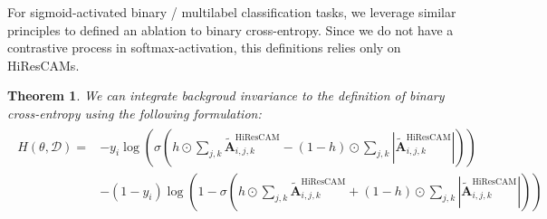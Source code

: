 \documentclass{article}
\theoremstyle{plain}
\newtheorem{theorem}{Theorem}[section]
\theoremstyle{definition}
\theoremstyle{remark}
\begin{document}
For sigmoid-activated binary / multilabel classification tasks, we leverage similar principles to defined an ablation to binary cross-entropy. Since we do not have a contrastive process in softmax-activation, this definitions relies only on HiResCAMs.

\begin{theorem}\label{abce}
	We can integrate backgroud invariance to the definition of binary cross-entropy using the following formulation:
	\begin{gather}
		\begin{split}
			H(\theta, \mathcal{D}) = &- y_i \log \left(\sigma\left(h \odot \sum_{j,k}\tilde{\mathcal{\bm{A}}}_{i,j,k}^{\text{HiResCAM}} - (1-h) \odot \sum_{j,k}|\tilde{\mathcal{\bm{A}}}_{i,j,k}^{\text{HiResCAM}}|\right) \right) \\
			&- (1 - y_i) \log \left(1 - \sigma\left(h \odot \sum_{j,k}\tilde{\mathcal{\bm{A}}}_{i,j,k}^{\text{HiResCAM}} + (1-h) \odot \sum_{j,k}|\tilde{\mathcal{\bm{A}}}_{i,j,k}^{\text{HiResCAM}}|\right) \right)
		\end{split}
	\end{gather}
\end{theorem}
\end{document}
